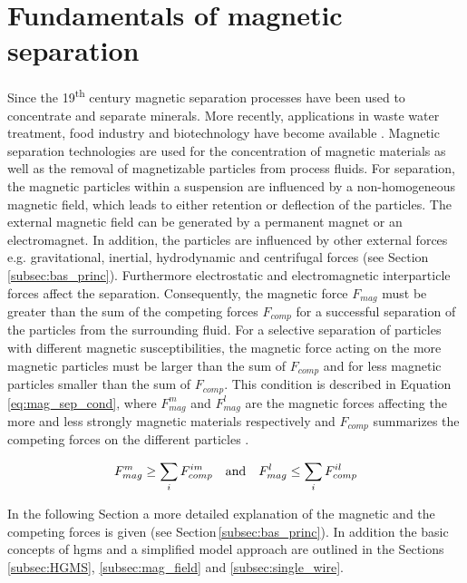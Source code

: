 \section{Fundamentals of magnetic separation}
\label{sec:Mag_sep}
Since the 19\textsuperscript{th} century magnetic separation processes have been used to concentrate and separate minerals. More recently, applications in waste water treatment, food industry and biotechnology have become available \cite{yavuz2009magnetic}. Magnetic separation technologies are used for the concentration of magnetic materials  as well as the removal of magnetizable particles from process fluids. For separation, the magnetic particles within a suspension are influenced by a non-homogeneous magnetic field, which leads to either retention or deflection of the particles. The external magnetic field can be generated by a permanent magnet or an electromagnet. In addition, the particles are influenced by other external forces e.g. gravitational, inertial, hydrodynamic and centrifugal forces (see Section\,\ref{subsec:bas_princ}). Furthermore electrostatic and electromagnetic interparticle forces affect the separation. Consequently, the magnetic force $F_{mag}$ must be greater than the sum of the competing forces $F_{comp}$ for a successful separation of the particles from the surrounding fluid. For a selective separation of particles with different magnetic susceptibilities, the magnetic force acting on the more magnetic particles must be larger than the sum of $F_{comp}$ and for less magnetic particles smaller than the sum of $F_{comp}$. This condition is described in Equation\,\ref{eq:mag_sep_cond}, where $F_{mag}^{m}$ and $F_{mag}^{l}$ are the magnetic forces affecting the more and less strongly magnetic materials respectively and $F_{comp}$ summarizes the competing forces on the different particles \cite{svoboda2004magnetic,oberteuffer1974magnetic}.   

\begin{equation}
\label{eq:mag_sep_cond}
\centering
F_{mag}^{m}\geq\sum_{i}F_{comp}^{im} \quad \textrm{and} \quad F_{mag}^{l}\leq\sum_{i}F_{comp}^{il}
\end{equation}

In the following Section a more detailed explanation of the magnetic and the competing forces is given (see Section\,\ref{subsec:bas_princ}). In addition the basic concepts of \gls{hgms} and a simplified model approach are outlined in the Sections\,\ref{subsec:HGMS}, \ref{subsec:mag_field} and \ref{subsec:single_wire}.  

